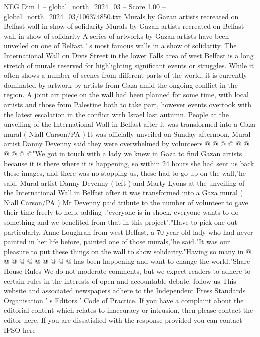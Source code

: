 \begin{textsample}{NEG Dim 1 – global\_north\_2024\_03 – Score 1.00 – global\_north\_2024\_03/106374850.txt}  \label{ex:f1_neg_391}
Murals by Gazan artists recreated on Belfast wall in show of solidarity Murals by Gazan artists recreated on Belfast wall in show of solidarity A series of artworks by Gazan artists have been unveiled on one of Belfast ' s most famous walls in a show of solidarity.
The International Wall on Divis Street in the lower Falls area of west Belfast is a long stretch of murals reserved for highlighting significant events or struggles.
While it often shows a number of scenes from different parts of the world, it is currently dominated by artwork by artists from Gaza amid the ongoing conflict in the region.
A joint art piece on the wall had been planned for some time, with local artists and those from Palestine both to take part, however events overtook with the latest escalation in the conflict with Israel last autumn.
People at the unveiling of the International Wall in Belfast after it was transformed into a Gaza mural ( Niall Carson/PA ) It was officially unveiled on Sunday afternoon.
Mural artist Danny Devenny said they were overwhelmed by volunteers @ @ @ @ @ @ @ @ @ @"We got in touch with a lady we knew in Gaza to find Gazan artists because it is there where it is happening, so within 24 hours she had sent us back these images, and there was no stopping us, these had to go up on the wall,"he said.
Mural artist Danny Devenny ( left ) and Marty Lyons at the unveiling of the International Wall in Belfast after it was transformed into a Gaza mural ( Niall Carson/PA ) Mr Devenny paid tribute to the number of volunteer to gave their time freely to help, adding :"everyone is in shock, everyone wants to do something and we benefited from that in this project"."Have to pick one out particularly, Anne Loughran from west Belfast, a 70-year-old lady who had never painted in her life before, painted one of those murals,"he said."It was our pleasure to put these things on the wall to show solidarity."Having so many in @ @ @ @ @ @ @ @ @ @ has been happening and want to change the world."Share House Rules We do not moderate comments, but we expect readers to adhere to certain rules in the interests of open and accountable debate. follow us This website and associated newspapers adhere to the Independent Press Standards Organisation ' s Editors ' Code of Practice.
If you have a complaint about the editorial content which relates to inaccuracy or intrusion, then please contact the editor here.
If you are dissatisfied with the response provided you can contact IPSO here

\end{textsample}
